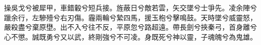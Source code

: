 
\begin{pinyinscope}
操吳戈兮被犀甲，車錯轂兮短兵接。旌蔽日兮敵若雲，矢交墜兮士爭先。凌余陣兮躐余行，左驂殪兮右刃傷。霾兩輪兮縶四馬，援玉枹兮擊鳴鼓。天時墜兮威靈怒，嚴殺盡兮棄原壄。出不入兮往不反，平原忽兮路超遠。帶長劍兮挾秦弓，首身離兮心不懲。誠既勇兮又以武，終剛強兮不可凌。身既死兮神以靈，子魂魄兮為鬼雄。


\end{pinyinscope}